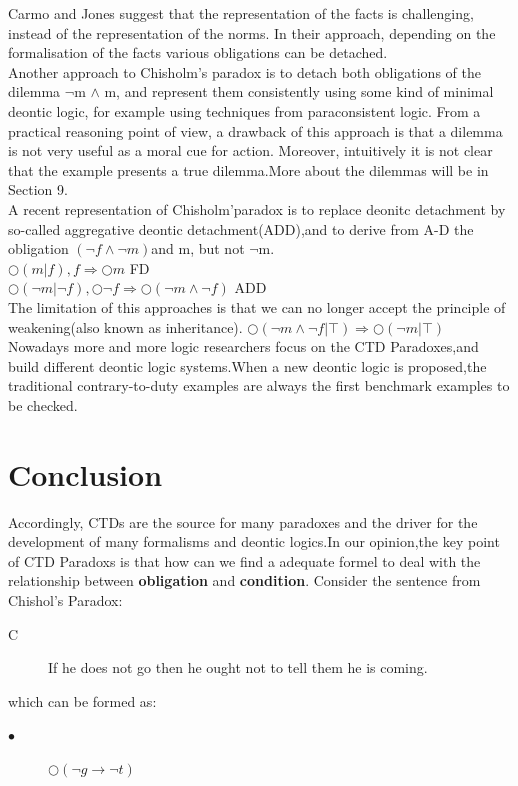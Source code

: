 \documentclass{article}
\begin{document}
  Carmo and Jones \cite{7} suggest that the representation of the facts is challenging,
instead of the representation of the norms. In their approach, depending on the
formalisation of the facts various obligations can be detached.\\
Another approach to Chisholm’s paradox is to detach both obligations of the
dilemma  $\neg$m $\wedge$ m, and represent them consistently using some kind of minimal deontic logic, for example using techniques from paraconsistent logic. From a practical reasoning point of view, a drawback of this approach is that a dilemma is not very useful as a moral cue for action. Moreover, intuitively it is not clear that the example presents a true dilemma.More about the dilemmas will be in Section 9.\\

A recent representation of Chisholm'paradox is to replace deonitc detachment by so-called aggregative deontic detachment(ADD),and to derive from A-D the obligation  $(\neg f \wedge \neg m)$and m, but not $\neg $m.\\
$\bigcirc (m|f),f \Rightarrow \bigcirc m $ FD\\
$\bigcirc(\neg m |\neg f),\bigcirc\neg f \Rightarrow \bigcirc(\neg m \wedge \neg f)$ ADD\\
The limitation of this approaches is that we can no longer accept the principle of weakening(also known as inheritance). 
$\bigcirc(\neg m \wedge\neg f|\top) \Rightarrow \bigcirc(\neg m |\top)$\\

Nowadays more and more logic researchers focus on the CTD Paradoxes,and build different deontic logic systems.When a new deontic logic is proposed,the traditional contrary-to-duty examples are always the first benchmark examples to be checked.

\section{Conclusion}
Accordingly, CTDs are the source for many paradoxes and the driver for the
development of many formalisms and deontic logics.In our opinion,the key point of CTD Paradoxs  is that how can we find a adequate formel to deal with the relationship between \textbf{obligation} and \textbf{condition}.
Consider the sentence from Chishol's Paradox:
\begin{description}
\item[C]  If he does not go then he ought not to tell them he is coming.
\end{description}
which can be formed as:
\begin{description}
\item[$\bullet $]$\bigcirc (\neg g \rightarrow\neg t)$
\end{description}
\end{document}
